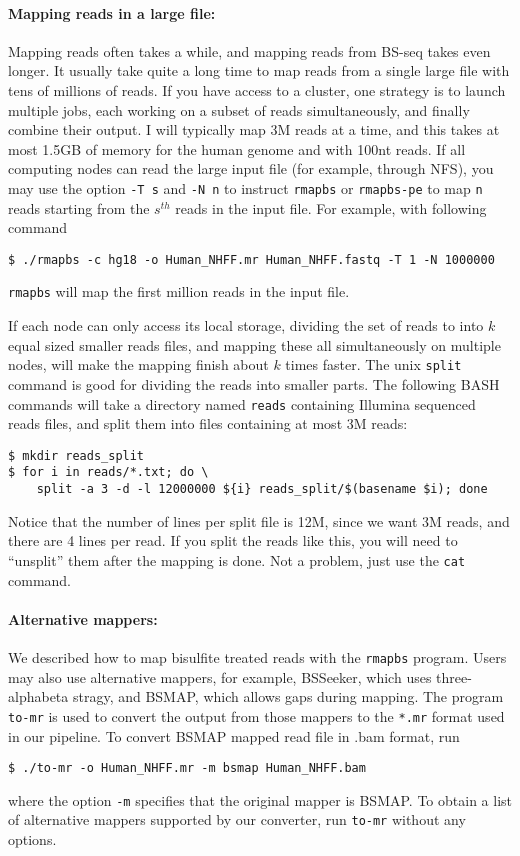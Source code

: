\documentclass[10pt]{article}
\newcommand{\prog}[1]{\texttt{#1}}
\newcommand{\fn}[1]{\texttt{#1}}
\newcommand{\op}[1]{\texttt{#1}}
\begin{document}
\paragraph{Mapping reads in a large file:} 
Mapping reads often takes a while, and mapping reads from BS-seq takes
even longer. It usually take quite a long time to map reads from a
single large file with tens of millions of reads. If you have access
to a cluster, one strategy is to launch multiple jobs, each working on
a subset of reads simultaneously, and finally combine their output. I
will typically map 3M reads at a time, and this takes at most 1.5GB of
memory for the human genome and with 100nt reads. If all computing
nodes can read the large input file (for example, through NFS), you
may use the option \op{-T s} and \op{-N n} to instruct \prog{rmapbs}
or \prog{rmapbs-pe} to map \op{n} reads starting from the $s^{th}$
reads in the input file. For example, with following command
\begin{verbatim}
$ ./rmapbs -c hg18 -o Human_NHFF.mr Human_NHFF.fastq -T 1 -N 1000000
\end{verbatim}
\prog{rmapbs} will map the first million reads in the input file.   
  
If each node can only access its local storage, dividing the set of
reads to into $k$ equal sized smaller reads files, and mapping these
all simultaneously on multiple nodes, will make the mapping finish
about $k$ times faster.  The unix \prog{split} command is good for
dividing the reads into smaller parts. The following BASH commands
will take a directory named \fn{reads} containing Illumina sequenced
reads files, and split them into files containing at most 3M reads:
\begin{verbatim}
$ mkdir reads_split
$ for i in reads/*.txt; do \
    split -a 3 -d -l 12000000 ${i} reads_split/$(basename $i); done
\end{verbatim}
Notice that the number of lines per split file is 12M, since we want
3M reads, and there are 4 lines per read. If you split the reads like
this, you will need to ``unsplit'' them after the mapping is done. Not
a problem, just use the \prog{cat} command.

\paragraph{Alternative mappers:}
\label{sec:alternative-mappers}
We described how to map bisulfite treated reads with the \prog{rmapbs}
program. Users may also use alternative mappers, for example,
BSSeeker, which uses three-alphabeta stragy, and BSMAP, which allows
gaps during mapping. The program \prog{to-mr} is used to convert the
output from those mappers to the \fn{*.mr} format used in our pipeline. To
convert BSMAP mapped read file in .bam format, run
\begin{verbatim}
$ ./to-mr -o Human_NHFF.mr -m bsmap Human_NHFF.bam
\end{verbatim}
where the option \op{-m} specifies that the original mapper is
BSMAP. To obtain a list of alternative mappers supported by our
converter, run \prog{to-mr} without any options. 
\end{document}
